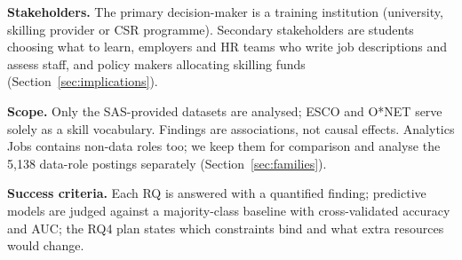 \textbf{Stakeholders.} The primary decision-maker is a training institution (university,
skilling provider or CSR programme). Secondary stakeholders are students choosing what to learn,
employers and HR teams who write job descriptions and assess staff, and policy makers allocating
skilling funds (Section~\ref{sec:implications}).

\textbf{Scope.} Only the SAS-provided datasets are analysed; ESCO and O*NET
\citep{esco2024,onet2025} serve solely as a skill vocabulary. Findings are associations, not
causal effects. Analytics Jobs contains non-data roles too; we keep them for comparison and analyse
the 5,138 data-role postings separately (Section~\ref{sec:families}).

\textbf{Success criteria.} Each RQ is answered with a quantified finding; predictive models are
judged against a majority-class baseline with cross-validated accuracy and AUC; the RQ4 plan states
which constraints bind and what extra resources would change.
